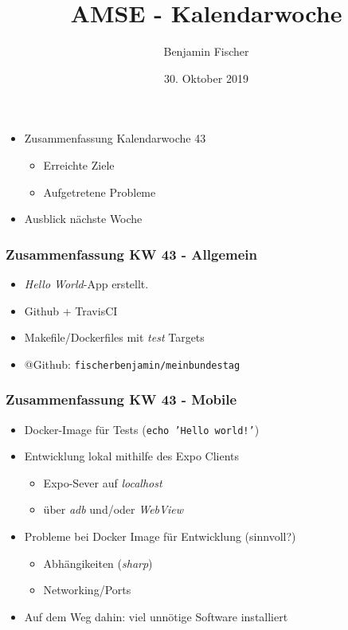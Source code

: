 \documentclass{beamer}
\title{AMSE - Kalendarwoche \cw{}}
\date{30. Oktober 2019}
\author{Benjamin Fischer}
\institute{benjamin.f.fischer@fau.de}
\newcommand{\cw}{43}
\begin{document}
  \maketitle

  \begin{frame}
    \begin{itemize}
      \item Zusammenfassung Kalendarwoche \cw{}
      \begin{itemize}
        \item Erreichte Ziele
        \item Aufgetretene Probleme
      \end{itemize}
      \item Ausblick nächste Woche
    \end{itemize}
  \end{frame}

  \begin{frame}
    \frametitle{Zusammenfassung KW \cw{} - Allgemein}
    \begin{itemize}
      \item \textit{Hello World}-App erstellt.
      \item Github + TravisCI
      \item Makefile/Dockerfiles mit \textit{test} Targets
      \item @Github: \texttt{fischerbenjamin/meinbundestag}
    \end{itemize}
  \end{frame}
  
  \begin{frame}
    \frametitle{Zusammenfassung KW \cw{} - Mobile}
    \begin{itemize}
      \item Docker-Image für Tests (\texttt{echo 'Hello world!'})
      \item Entwicklung lokal mithilfe des Expo Clients
      \begin{itemize}
        \item Expo-Sever auf \textit{localhost}
        \item über \textit{adb} und/oder \textit{WebView}
      \end{itemize}
      \item Probleme bei Docker Image für Entwicklung (sinnvoll?)
      \begin{itemize}
        \item Abhängikeiten (\textit{sharp})
        \item Networking/Ports
      \end{itemize}
      \item Auf dem Weg dahin: viel unnötige Software installiert
    \end{itemize}
  \end{frame}
\end{document}

